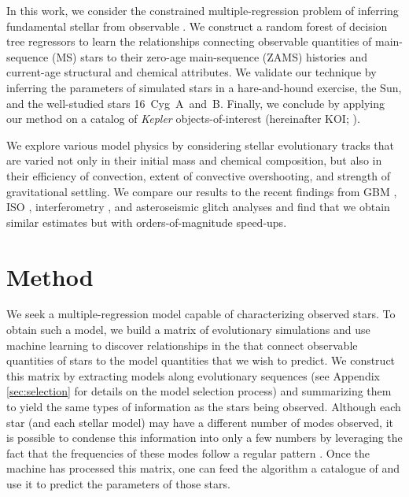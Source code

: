 In this work, we consider the constrained multiple-regression problem of inferring fundamental stellar  from observable . We construct a random forest of decision tree regressors to learn the relationships connecting observable quantities of main-sequence (MS) stars to their zero-age main-sequence (ZAMS) histories and  current-age structural and chemical attributes. We validate our technique by inferring the parameters of simulated stars in a hare-and-hound exercise, the Sun, and the well-studied stars 16~Cyg~A~and~B. Finally, we conclude by applying our method on a catalog of \emph{Kepler} objects-of-interest (hereinafter KOI; \citealt{2016MNRAS.456.2183D}).  

We explore various model physics by considering stellar evolutionary tracks that are varied not only in their initial mass and chemical composition, but also in their efficiency of convection, extent of convective overshooting, and strength of gravitational settling. We compare our results to the recent findings from GBM \citep{2015MNRAS.452.2127S}, ISO \citep{2015ApJ...811L..37M}, interferometry \citep{2013MNRAS.433.1262W}, and asteroseismic glitch analyses \citep{2014ApJ...790..138V} and find that we obtain similar estimates but with orders-of-magnitude speed-ups. 


\section{Method} \label{sec:Method} 
We seek a multiple-regression model capable of characterizing observed stars. To obtain such a model, we build a matrix of evolutionary simulations and use machine learning to discover relationships in the  that connect observable quantities of stars to the model quantities that we wish to predict.  We construct this matrix by extracting models along evolutionary sequences (see Appendix \ref{sec:selection} for details on the model selection process) and summarizing them to yield the same types of information as the stars being observed. Although each star (and each stellar model) may have a different number of  modes observed, it is possible to condense this information into only a few numbers by leveraging the fact that the frequencies of these modes follow a regular pattern \citep[for a review of solar-like oscillations, see][]{2013ARA&A..51..353C}. Once the machine has processed this matrix, one can feed the algorithm a catalogue of  and use it to predict the  parameters of those stars.


